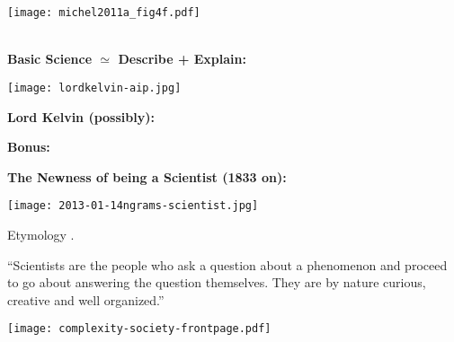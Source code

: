   \begin{marginfigure}[]
\texttt{[image: michel2011a\_fig4f.pdf]}
\end{marginfigure}


  {\small
    \\
  }
  \textbf{Basic Science $\simeq$ Describe + Explain:}
    
    \begin{marginfigure}[]
\texttt{[image: lordkelvin-aip.jpg]}
\end{marginfigure}

    
    \textbf{Lord Kelvin (possibly):}
       
    \textbf{Bonus:}
        {
        }
      
        {
        }
  
  \textbf{The Newness of being a Scientist (1833 on):}

  \begin{marginfigure}[]
\texttt{[image: 2013-01-14ngrams-scientist.jpg]}
\end{marginfigure}

    
     
      Etymology 
      .
     
      ``Scientists are the people who ask a question about a phenomenon and proceed to  go about answering the question themselves. They are by nature curious, creative and well organized.''
  

\begin{marginfigure}[]
\texttt{[image: complexity-society-frontpage.pdf]}
\end{marginfigure}


